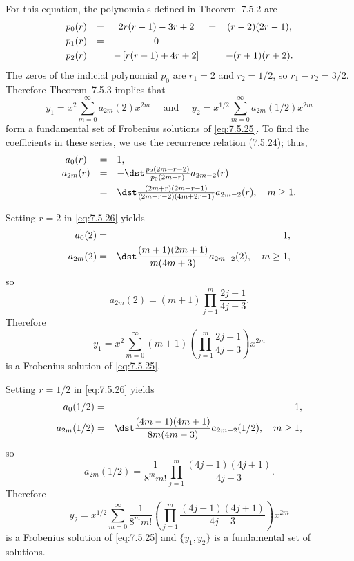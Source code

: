 \begin{examplesolution}
\solution For this equation, the polynomials defined in Theorem~7.5.2 are
\[
  \begin{array}{ccccc}
    p_{0}(r) & = & 2r(r-1)-3r+2              & = & (r-2)(2r-1), \\[1\jot]
    p_{1}(r) & = & 0                          \\[1\jot]
    p_{2}(r) & = & -\left[r(r-1)+4r+2\right] & = & -(r+1)(r+2).
  \end{array}
\]
The zeros of the indicial polynomial $p_{0}$ are $r_{1}=2$ and $r_{2}=1/2$, so $r_{1}-r_{2}=3/2$.
Therefore Theorem~7.5.3 implies that
\[
  y_{1}=x^{2}\sum_{m=0}^{\infty}a_{2m}(2)x^{2m}\quad\mbox{ and }\quad y_{2}=x^{1/2}\sum_{m=0}^{\infty}a_{2m}(1/2)x^{2m}
\]
form a fundamental set of Frobenius solutions of \eqref{eq:7.5.25}. To find the coefficients in
these series, we use the recurrence relation \textup{(7.5.24)}; thus,
\begin{equation}
  \label{eq:7.5.26}
  \begin{array}{ccl}
    a_{0}(r)  & = & 1,                                                                   \\
    a_{2m}(r) & = & -\dst\frac{p_{2}(2m+r-2)}{p_{0}(2m+r)}a_{2m-2}(r)                    \\[2\jot]
              & = & \dst\frac{(2m+r)(2m+r-1)}{(2m+r-2)(4m+2r-1)}a_{2m-2}(r),\quad m\ge1.
  \end{array}
\end{equation}

Setting $r=2$ in \eqref{eq:7.5.26} yields
\begin{eqnarray*}
  a_{0}(2)  & = & 1, \\
  a_{2m}(2) & = & \dst\frac{(m+1)(2m+1)}{m(4m+3)}a_{2m-2}(2),\quad m\ge1,
\end{eqnarray*}
so
\[
  a_{2m}(2)=(m+1)\prod_{j=1}^{m}\frac{2j+1}{4j+3}.
\]
Therefore
\[
  y_{1}=x^{2}\sum_{m=0}^{\infty}(m+1)\left(\prod_{j=1}^{m}\frac{2j+1}{4j+3}\right)x^{2m}
\]
is a Frobenius solution of \eqref{eq:7.5.25}.

Setting $r=1/2$ in \eqref{eq:7.5.26} yields
\begin{eqnarray*}
  a_{0}(1/2)  & = & 1, \\
  a_{2m}(1/2) & = & \dst\frac{(4m-1)(4m+1)}{8m(4m-3)}a_{2m-2}(1/2),\quad m\ge1,
\end{eqnarray*}
so
\[
  a_{2m}(1/2)=\frac{1}{8^{m}m!}\prod_{j=1}^{m}\frac{(4j-1)(4j+1)}{4j-3}.
\]
Therefore
\[
  y_{2}=x^{1/2}\sum_{m=0}^{\infty}\frac{1}{8^{m}m!}\left(\prod_{j=1}^{m}\frac{(4j-1)(4j+1)}{4j-3}\right)x^{2m}
\]
is a Frobenius solution of \eqref{eq:7.5.25} and $\{y_{1},y_{2}\}$ is a fundamental set of
solutions.
\end{examplesolution}

